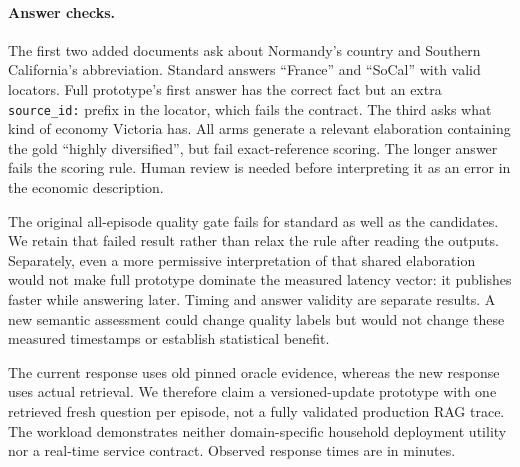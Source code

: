 \paragraph{Answer checks.}
The first two added documents ask about Normandy's country and Southern
California's abbreviation. Standard answers ``France'' and ``SoCal'' with valid
locators. Full prototype's first answer has the correct fact but an extra
\texttt{source\_id:} prefix in the locator, which fails the contract. The third
asks what kind of economy Victoria has. All arms generate a relevant elaboration
containing the gold ``highly diversified'', but fail exact-reference scoring.
The longer answer fails the scoring rule. Human review is needed before
interpreting it as an error in the economic description.

The original all-episode quality gate fails for standard as well as the
candidates. We retain that failed result rather than relax the rule after reading the outputs. Separately, even a more permissive interpretation of that
shared elaboration would not make full prototype dominate the measured latency
vector: it publishes faster while answering later. Timing and answer validity are separate results. A new semantic assessment could change quality labels
but would not change these measured timestamps or establish statistical benefit.

The current response uses old pinned oracle evidence, whereas the new response
uses actual retrieval. We therefore claim a versioned-update prototype with one
retrieved fresh question per episode, not a fully validated production RAG
trace. The workload demonstrates neither domain-specific household deployment
utility nor a real-time service contract. Observed response times are in minutes.
